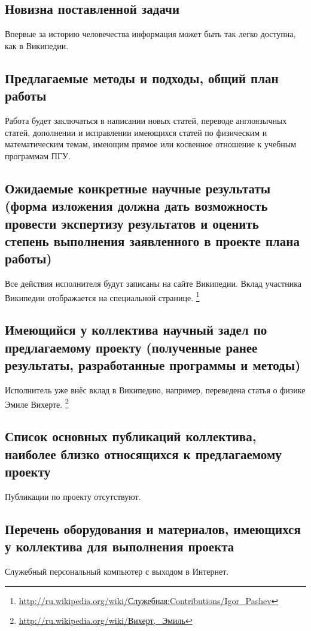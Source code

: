 \subsection{Новизна поставленной задачи}
Впервые за историю человечества информация может быть так легко доступна,
как в Википедии.


\subsection{Предлагаемые методы и подходы, общий план работы}
Работа будет заключаться в написании новых статей, переводе англоязычных
статей, дополнении и исправлении имеющихся статей по физическим и
математическим темам, имеющим прямое или косвенное отношение к учебным
программам ПГУ.

\subsection{Ожидаемые конкретные научные результаты (форма изложения должна дать возможность провести экспертизу результатов и оценить степень выполнения заявленного в проекте плана работы)}
Все действия исполнителя будут записаны на сайте Википедии. Вклад
участника Википедии отображается на специальной странице.%
\footnote{\href{http://ru.wikipedia.org/wiki/\%D0\%A1\%D0\%BB\%D1\%83\%D0\%B6\%D0\%B5\%D0\%B1\%D0\%BD\%D0\%B0\%D1\%8F:Contributions/Igor_Pashev}{http://ru.wikipedia.org/wiki/Служебная:Contributions/Igor\_{}Pashev}%
}

\subsection{Имеющийся у коллектива научный задел
по предлагаемому проекту (полученные ранее результаты, разработанные программы и методы)}

Исполнитель уже внёс вклад в Википедию, например, переведена статья
о физике Эмиле Вихерте.%
\footnote{\href{http://ru.wikipedia.org/wiki/\%D0\%92\%D0\%B8\%D1\%85\%D0\%B5\%D1\%80\%D1\%82,_\%D0\%AD\%D0\%BC\%D0\%B8\%D0\%BB\%D1\%8C}{http://ru.wikipedia.org/wiki/Вихерт,\_{}Эмиль}%
}

\subsection{Список основных публикаций коллектива, наиболее близко относящихся к предлагаемому проекту}
Публикации по проекту отсутствуют.

\subsection{Перечень оборудования и материалов, имеющихся у коллектива для выполнения проекта}
Служебный персональный компьютер с выходом в Интернет.

